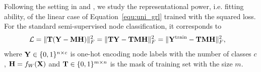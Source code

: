 \documentclass{article} %
\begin{document}
	
	
	
	Following the setting in \citet{xu2021optimization} and \citet{JacobiConv}, we study the representational power, i.e. fitting ability, of the linear case of Equation~\ref{equ:uni_grl} trained with the squared loss.
	For the standard semi-supervised node classification, it corresponds to
	\begin{equation}
		\label{equ:square}
		\begin{aligned}
			{\mathcal{L}}&=\|{\mathbf{T}}({\mathbf{Y}}-{\mathbf{M}}{\mathbf{H}})\|^2_F=\|{\mathbf{T}}{\mathbf{Y}}-{\mathbf{T}}{\mathbf{M}}{\mathbf{H}}\|^2_F=\|{\mathbf{Y}}^{\textrm{train}}-{\mathbf{T}}{\mathbf{M}}{\mathbf{H}}\|^2_F,
		\end{aligned}
	\end{equation}
	where ${\mathbf{Y}}\in\{0,1\}^{n\times c}$ is one-hot encoding node labels with the number of classes $c$, ${\mathbf{H}}=f_W({\mathbf{X}})$ and ${\mathbf{T}}\in\{0,1\}^{m\times n}$ is the mask of training set with the size $m$.
	
\end{document}
